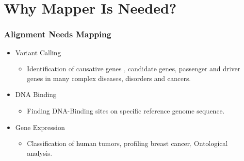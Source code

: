 \section{Why Mapper Is Needed?}

\begin{frame}
	\frametitle{Alignment Needs Mapping}
	
	\begin{itemize}
		\item<1-> Variant Calling
		\begin{itemize}
			\item<1-> Identification of causative genes , candidate genes, passenger and driver genes in many complex diseases, disorders and cancers.
		\end{itemize}
		\item<2-> DNA Binding
		\begin{itemize}
			\item<2-> Finding DNA-Binding sites on specific reference genome sequence.
		\end{itemize}
		\item<3-> Gene Expression
		\begin{itemize}
			\item<3-> Classification of human tumors, profiling breast cancer, Ontological analysis.
		\end{itemize}
	\end{itemize}
\end{frame}
